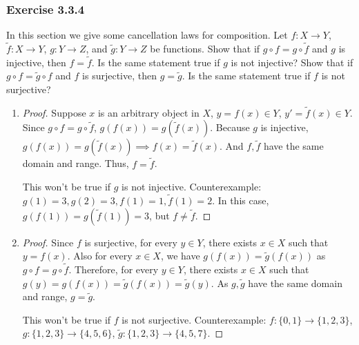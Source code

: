 \documentclass[12pt, letter]{article}
\begin{document}
\subsubsection*{Exercise 3.3.4}
In this section we give some cancellation laws for composition. Let $f:X\to Y$, $\tilde{f}:X\to Y$, $g:Y\to Z$, and $\tilde{g}:Y\to Z$ be functions.
Show that if $g\circ f=g\circ \tilde{f}$ and $g$ is injective, then $f=\tilde{f}$. Is the same statement true if $g$ is not injective?
Show that if $g\circ f=\tilde{g}\circ f$ and $f$ is surjective, then $g=\tilde{g}$. Is the same statement true if $f$ is not surjective?
\begin{enumerate}
    \item 
    \begin{proof}
        Suppose $x$ is an arbitrary object in $X$, $y=f(x)\in Y$, $y'=\tilde{f}(x)\in Y$. Since $g\circ f=g\circ\tilde{f}$, $g(f(x))=g(\tilde{f}(x))$. Because $g$ is injective, 
    $g(f(x))=g(\tilde{f}(x))\implies f(x)=\tilde{f}(x)$. And $f,\tilde{f}$ have the same domain and range. Thus, $f=\tilde{f}$.

    This won't be true if $g$ is not injective. Counterexample: $g(1)=3, g(2)=3, f(1)=1, \tilde{f}(1)=2$. In this case, $g(f(1))=g(\tilde{f}(1))=3$, but $f\ne\tilde{f}$.
    \end{proof}
    \item 
    \begin{proof}
        Since $f$ is surjective, for every $y\in Y$, there exists $x\in X$ such that $y=f(x)$. Also for every $x\in X$, we have $g(f(x))=\tilde{g}(f(x))$ as $g\circ f=g\circ\tilde{f}$.
    Therefore, for every $y\in Y$, there exists $x\in X$ such that $g(y)=g(f(x))=\tilde{g}(f(x))=\tilde{g}(y)$. As $g,\tilde{g}$ have the same domain and range,
    $g=\tilde{g}$.

    This won't be true if $f$ is not surjective. Counterexample: $f:\{0,1\}\to\{1,2,3\}$, $g:\{1,2,3\}\to\{4,5,6\}$, $\tilde{g}:\{1,2,3\}\to\{4,5,7\}$.
    \end{proof}
\end{enumerate}
\end{document}
